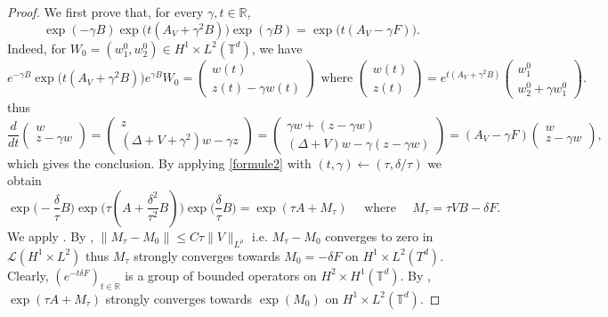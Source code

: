 \documentclass[a4paper]{article}
\theoremstyle{plain}
\newcommand{\T}{\mathbb{T}}
\begin{document}
\begin{proof}
    We first prove that, for every $\gamma, t \in \mathbb{R}$,
\begin{equation} \label{formule2}
\exp(-\gamma B) \exp\big(t (A_V+\gamma^2 B)\big) \exp( \gamma B) = \exp\big(t(A_V-\gamma F)\big).
\end{equation}
Indeed, for $W_0=(w_1^0,w_2^0) \in H^1 \times L^2(\T^d)$, we have
$$e^{-\gamma B} \exp\big(t (A_V+\gamma^2 B) \big) e^{ \gamma B} W_0 =
\begin{pmatrix}
    w(t) \\ z(t)-\gamma w(t)
\end{pmatrix}
\text{ where } 
\begin{pmatrix}
    w(t) \\ z(t)
\end{pmatrix}
= e^{t(A_V +\gamma^2 B)} \begin{pmatrix}
    w_1^0 \\ w_2^0+\gamma w_1^0
\end{pmatrix}.$$
thus
$$\frac{d}{dt} 
\begin{pmatrix}
    w \\ z-\gamma w
\end{pmatrix}
\!=\!
\begin{pmatrix}
    z \\ (\Delta+V+\gamma^2)w-\gamma z
\end{pmatrix}
\!=\!\begin{pmatrix}
   \gamma w + (z-\gamma w) \\ (\Delta+V)w-\gamma (z-\gamma w)
\end{pmatrix}
\!=\! (A_V-\gamma F) \begin{pmatrix}
    w \\ z-\gamma w
\end{pmatrix},$$
which gives the conclusion. By applying \eqref{formule2} with $(t,\gamma) \leftarrow (\tau,\delta/\tau)$ we obtain
$$ \exp\big(-\frac{\delta}{\tau} B\big) \exp\big( \tau(A+\frac{\delta^2}{\tau^2}B) \big) \exp\big(\frac{\delta}{\tau} B\big)
= \exp(\tau A + M_{\tau})
\quad \text{ where } \quad
M_{\tau} = \tau V B - \delta F.
$$
We apply .
By ,
$\|M_{\tau}-M_0\| \leq C \tau \|V\|_{L^{\rho}}$ i.e.
$M_{\tau}-M_0$ converges to zero in $\mathcal{L}(H^1 \times L^2)$ thus
$M_{\tau}$ strongly converges towards $M_0=-\delta F$ on $H^1 \times L^2(T^d)$. Clearly, $(e^{-t\delta F})_{t\in\mathbb{R}}$ is a group of bounded operators on $H^2 \times H^1(\T^d)$. By ,
$\exp(\tau A + M_{\tau})$ strongly converges towards $\exp(M_0)$ on $H^1 \times L^2(\T^d)$.
\end{proof}
\end{document}
